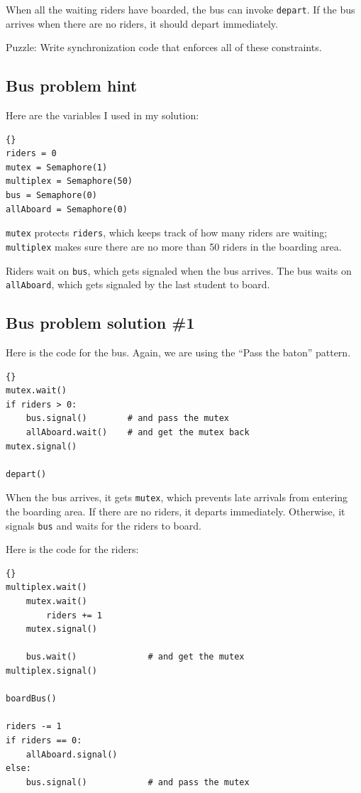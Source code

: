\documentclass{book}
\newcommand{\clearemptydoublepage}{\newpage\cleardoublepage}
\begin{document}
When all the waiting riders have boarded,
the bus can invoke {\tt depart}.  If the bus arrives when there
are no riders, it should depart immediately.

Puzzle: Write synchronization code that enforces all of these
constraints.


\clearemptydoublepage
\subsection {Bus problem hint}

Here are the variables I used in my solution:

\begin{lstlisting}[caption={Bus problem hint}]{}
riders = 0
mutex = Semaphore(1)
multiplex = Semaphore(50)
bus = Semaphore(0)
allAboard = Semaphore(0)
\end{lstlisting}

{\tt mutex} protects {\tt riders}, which keeps track of
how many riders are waiting;
{\tt multiplex} makes sure there are no more than 50 riders
in the boarding area.

Riders wait on
{\tt bus}, which gets signaled when the bus arrives.  The
bus waits on {\tt allAboard}, which gets signaled by the last
student to board.


\clearemptydoublepage
\subsection {Bus problem solution \#1}

Here is the code for the bus.  Again, we are using the
``Pass the baton'' pattern.

\begin{lstlisting}[caption={Bus problem solution (bus)}]{}
mutex.wait()
if riders > 0:
    bus.signal()        # and pass the mutex
    allAboard.wait()    # and get the mutex back
mutex.signal()

depart()
\end{lstlisting}

When the bus arrives, it gets {\tt mutex}, which
prevents late arrivals from entering the boarding area.  If there
are no riders, it departs immediately.  Otherwise, it signals {\tt bus}
and waits for the riders to board.

Here is the code for the riders:

\begin{lstlisting}[caption={Bus problem solution (riders)}]{}
multiplex.wait()
    mutex.wait()
        riders += 1
    mutex.signal()

    bus.wait()              # and get the mutex
multiplex.signal()

boardBus()

riders -= 1
if riders == 0:
    allAboard.signal() 
else:
    bus.signal()            # and pass the mutex
\end{lstlisting}
\end{document}
